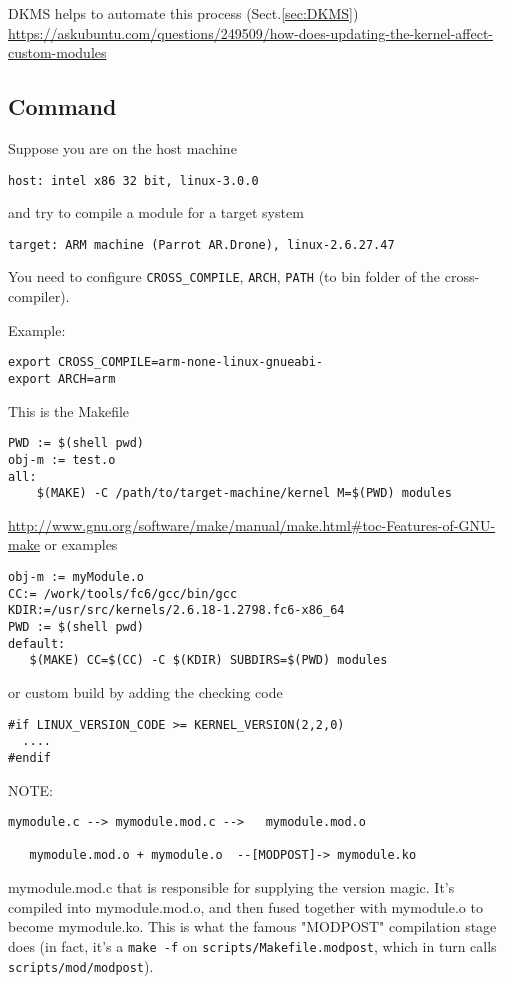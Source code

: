 DKMS helps to automate this process (Sect.\ref{sec:DKMS})
\url{https://askubuntu.com/questions/249509/how-does-updating-the-kernel-affect-custom-modules}

\subsection{Command}

Suppose you are on the host machine
\begin{verbatim}
host: intel x86 32 bit, linux-3.0.0
\end{verbatim}
and try to compile a module for a target system
\begin{verbatim}
target: ARM machine (Parrot AR.Drone), linux-2.6.27.47
\end{verbatim}

You need to configure \verb!CROSS_COMPILE!, \verb!ARCH!, \verb!PATH! (to bin
folder of the cross-compiler).

Example:
\begin{verbatim}
export CROSS_COMPILE=arm-none-linux-gnueabi- 
export ARCH=arm  
\end{verbatim}

This is the Makefile
\begin{verbatim}
PWD := $(shell pwd)
obj-m := test.o
all:
    $(MAKE) -C /path/to/target-machine/kernel M=$(PWD) modules
\end{verbatim}
\url{http://www.gnu.org/software/make/manual/make.html#toc-Features-of-GNU-make}
or examples
\begin{verbatim}
obj-m := myModule.o
CC:= /work/tools/fc6/gcc/bin/gcc
KDIR:=/usr/src/kernels/2.6.18-1.2798.fc6-x86_64
PWD := $(shell pwd)
default:
   $(MAKE) CC=$(CC) -C $(KDIR) SUBDIRS=$(PWD) modules
\end{verbatim}
or custom build by adding the checking code
\begin{verbatim}
#if LINUX_VERSION_CODE >= KERNEL_VERSION(2,2,0)
  ....
#endif
\end{verbatim}

NOTE:
\begin{verbatim}
mymodule.c --> mymodule.mod.c -->   mymodule.mod.o
   
   mymodule.mod.o + mymodule.o  --[MODPOST]-> mymodule.ko
\end{verbatim} 
mymodule.mod.c that is responsible for supplying the version magic. It's
compiled into mymodule.mod.o, and then fused together with mymodule.o to become
mymodule.ko. This is what the famous "MODPOST" compilation stage does (in fact,
it's a \verb!make -f! on \verb!scripts/Makefile.modpost!, which in turn calls
\verb!scripts/mod/modpost!).
  
